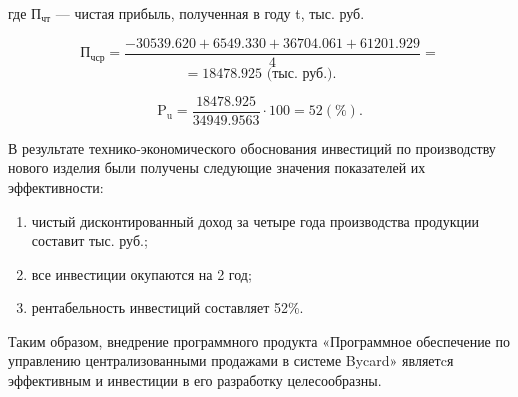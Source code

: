 где \(\text{П}_{\text{чт}}\) --- чистая прибыль, полученная в году t, тыс. руб. 

\begin{equation}
  \text{П}_{\text{чср}} = \frac{-30539.620+6549.330+36704.061+61201.929}{4} =
\end{equation}
\begin{equation}
  = 18478.925 \text{ (тыс. руб.)}.
\end{equation}

\begin{equation}
  \text{P}_{\text{u}} = \frac{18478.925}{34949.9563}\cdot100=52(\%).
\end{equation}

В результате технико-экономического обоснования инвестиций по производству нового изделия были получены следующие значения показателей их эффективности:
\begin{enumerate}
    \item чистый дисконтированный доход за четыре года производства продукции составит тыс. руб.;
    \item все инвестиции окупаются на 2 год;  
    \item рентабельность инвестиций составляет 52\%.
\end{enumerate}

Таким образом, внедрение программного продукта «Программное обеспечение по управлению централизованными продажами в системе Bycard» являетcя эффективным и инвестиции в его разработку целесообразны.


\newpage